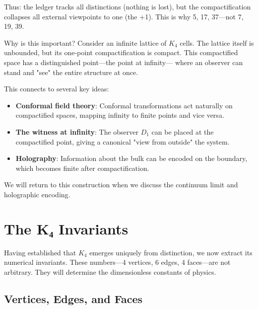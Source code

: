\documentclass[11pt,a4paper]{book}
\begin{document}
Thus: the ledger tracks all distinctions (nothing is lost), but the compactification 
collapses all external viewpoints to one (the +1). This is why 5, 17, 37---not 
7, 19, 39.

Why is this important? Consider an infinite lattice of $K_4$ cells. The 
lattice itself is unbounded, but its one-point compactification is compact. 
This compactified space has a distinguished point---the point at infinity---
where an observer can stand and "see" the entire structure at once.

This connects to several key ideas:
\begin{itemize}
\item \textbf{Conformal field theory}: Conformal transformations act naturally 
on compactified spaces, mapping infinity to finite points and vice versa.
\item \textbf{The witness at infinity}: The observer $D_1$ can be placed at 
the compactified point, giving a canonical "view from outside" the system.
\item \textbf{Holography}: Information about the bulk can be encoded on the 
boundary, which becomes finite after compactification.
\end{itemize}

We will return to this construction when we discuss the continuum limit and 
holographic encoding.

\chapter{The K₄ Invariants}
\label{chap:k4-invariants}

Having established that $K_4$ emerges uniquely from distinction, we now extract its 
numerical invariants. These numbers—4 vertices, 6 edges, 4 faces—are not arbitrary. 
They will determine the dimensionless constants of physics.

\section{Vertices, Edges, and Faces}
\end{document}

